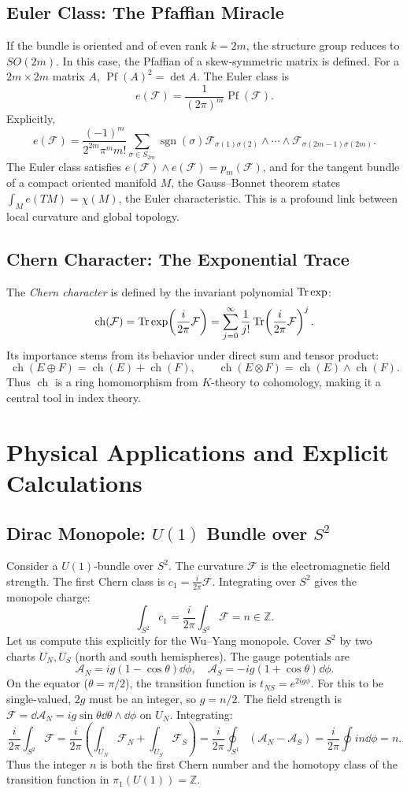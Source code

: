 \documentclass[11pt]{article}
\newcommand{\Pf}{\operatorname{Pf}}    %
\newcommand{\ch}{\operatorname{ch}}    %
\newcommand{\cA}{\mathcal{A}}
\newcommand{\cF}{\mathcal{F}}
\newcommand{\Z}{\mathbb{Z}}
\begin{document}
\subsection{Euler Class: The Pfaffian Miracle}
If the bundle is oriented and of even rank \(k=2m\), the structure group reduces to \(SO(2m)\). In this case, the Pfaffian of a skew-symmetric matrix is defined. For a \(2m\times 2m\) matrix \(A\), \(\Pf(A)^2 = \det A\). The Euler class is
\[
e(\cF) = \frac{1}{(2\pi)^m} \Pf(\cF).
\]
Explicitly,
\[
e(\cF) = \frac{(-1)^m}{2^{2m}\pi^m m!} \sum_{\sigma\in S_{2m}} \operatorname{sgn}(\sigma) \cF_{\sigma(1)\sigma(2)} \wedge \cdots \wedge \cF_{\sigma(2m-1)\sigma(2m)}.
\]
The Euler class satisfies \(e(\cF)\wedge e(\cF) = p_m(\cF)\), and for the tangent bundle of a compact oriented manifold \(M\), the Gauss--Bonnet theorem states \(\int_M e(TM) = \chi(M)\), the Euler characteristic. This is a profound link between local curvature and global topology.

\subsection{Chern Character: The Exponential Trace}
The \emph{Chern character} is defined by the invariant polynomial \(\Tr\exp\):
\[
\ch(\cF) = \Tr\exp\!\left(\frac{i}{2\pi}\cF\right) = \sum_{j=0}^\infty \frac{1}{j!} \Tr\!\left(\frac{i}{2\pi}\cF\right)^j.
\]
Its importance stems from its behavior under direct sum and tensor product:
\[
\ch(E\oplus F) = \ch(E) + \ch(F), \qquad \ch(E\otimes F) = \ch(E) \wedge \ch(F).
\]
Thus \(\ch\) is a ring homomorphism from \(K\)-theory to cohomology, making it a central tool in index theory.

\section{Physical Applications and Explicit Calculations}
\label{sec:applications}

\subsection{Dirac Monopole: \(U(1)\) Bundle over \(S^2\)}
Consider a \(U(1)\)-bundle over \(S^2\). The curvature \(\cF\) is the electromagnetic field strength. The first Chern class is \(c_1 = \frac{i}{2\pi}\cF\). Integrating over \(S^2\) gives the monopole charge:
\[
\int_{S^2} c_1 = \frac{i}{2\pi} \int_{S^2} \cF = n \in \Z.
\]
Let us compute this explicitly for the Wu--Yang monopole. Cover \(S^2\) by two charts \(U_N, U_S\) (north and south hemispheres). The gauge potentials are
\[
\cA_N = i g (1-\cos\theta)\dd\phi, \quad \cA_S = -i g (1+\cos\theta)\dd\phi.
\]
On the equator (\(\theta=\pi/2\)), the transition function is \(t_{NS} = e^{2ig\phi}\). For this to be single-valued, \(2g\) must be an integer, so \(g = n/2\). The field strength is \(\cF = \dd\cA_N = i g \sin\theta \dd\theta\wedge\dd\phi\) on \(U_N\). Integrating:
\[
\frac{i}{2\pi}\int_{S^2} \cF = \frac{i}{2\pi} \left( \int_{U_N} \cF_N + \int_{U_S} \cF_S \right) = \frac{i}{2\pi} \oint_{S^1} (\cA_N - \cA_S) = \frac{i}{2\pi} \oint i n \dd\phi = n.
\]
Thus the integer \(n\) is both the first Chern number and the homotopy class of the transition function in \(\pi_1(U(1))=\Z\).
\end{document}
